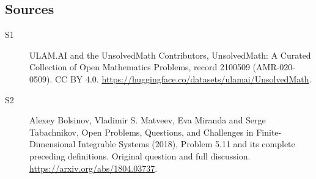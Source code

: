 \documentclass[11pt]{article}
\begin{document}
\subsection{Sources}
\begin{description}
\item[\hypertarget{source:2100509:1}{S1}] ULAM.AI and the UnsolvedMath Contributors, UnsolvedMath: A Curated Collection of Open Mathematics Problems, record 2100509 (AMR-020-0509). CC BY 4.0. \url{https://huggingface.co/datasets/ulamai/UnsolvedMath}.
\item[\hypertarget{source:2100509:2}{S2}] Alexey Bolsinov, Vladimir S. Matveev, Eva Miranda and Serge Tabachnikov, Open Problems, Questions, and Challenges in Finite-Dimensional Integrable Systems (2018), Problem 5.11 and its complete preceding definitions. Original question and full discussion. \url{https://arxiv.org/abs/1804.03737}.

\end{description}
\label{end:2100509}
\end{document}
